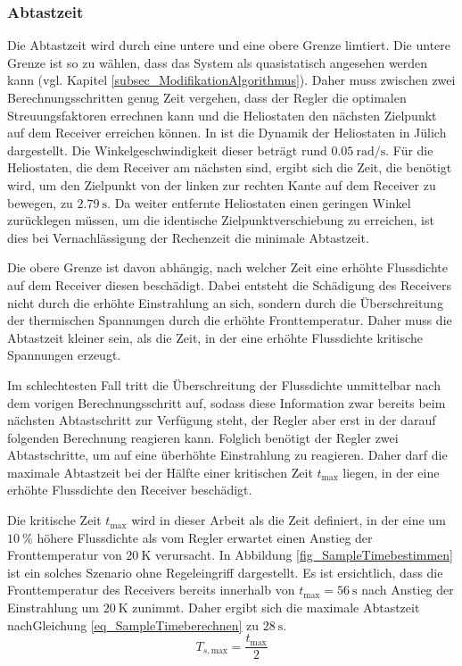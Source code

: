 \subsubsection*{Abtastzeit} \label{subsubsec_sampletime}
Die Abtastzeit wird durch eine untere und eine obere Grenze limtiert.
Die untere Grenze ist so zu wählen, dass das System als quasistatisch angesehen werden kann (vgl. Kapitel \ref{subsec_ModifikationAlgorithmus}).
Daher muss zwischen zwei Berechnungsschritten genug Zeit vergehen, dass der Regler die optimalen Streuungsfaktoren errechnen kann und die Heliostaten den nächsten Zielpunkt auf dem Receiver erreichen können.
In \cite[S.25-26]{DissZanger} ist die Dynamik der Heliostaten in Jülich dargestellt.
Die Winkelgeschwindigkeit dieser beträgt rund $\SI{0,05}{\radian \per \second}$.
Für die Heliostaten, die dem Receiver am nächsten sind, ergibt sich die Zeit, die benötigt wird, um den Zielpunkt von der linken zur rechten Kante auf dem Receiver zu bewegen, zu $\SI{2.79}{\second}$.
Da weiter entfernte Heliostaten einen geringen Winkel zurücklegen müssen, um die identische Zielpunktverschiebung zu erreichen, ist dies bei Vernachlässigung der Rechenzeit die minimale Abtastzeit.

Die obere Grenze ist davon abhängig, nach welcher Zeit eine erhöhte Flussdichte auf dem Receiver diesen beschädigt.
Dabei entsteht die Schädigung des Receivers nicht durch die erhöhte Einstrahlung an sich, sondern durch die Überschreitung der thermischen Spannungen durch die erhöhte Fronttemperatur.
Daher muss die Abtastzeit kleiner sein, als die Zeit, in der eine erhöhte Flussdichte kritische Spannungen erzeugt.

Im schlechtesten Fall tritt die Überschreitung der Flussdichte unmittelbar nach dem vorigen Berechnungsschritt auf, sodass diese Information zwar bereits beim nächsten Abtastschritt zur Verfügung steht, der Regler aber erst in der darauf folgenden Berechnung reagieren kann.
Folglich benötigt der Regler zwei Abtastschritte, um auf eine überhöhte Einstrahlung zu reagieren.
Daher darf die maximale Abtastzeit bei der Hälfte einer kritischen Zeit $t_{\mathrm{max}}$ liegen, in der eine erhöhte Flussdichte den Receiver beschädigt.

Die kritische Zeit $t_{\mathrm{max}}$ wird in dieser Arbeit als die Zeit definiert, in der eine um $\SI{10}{\percent}$ höhere Flussdichte als vom Regler erwartet einen Anstieg der Fronttemperatur von $\SI{20}{\kelvin}$ verursacht.
In Abbildung \ref{fig_SampleTimebestimmen} ist ein solches Szenario ohne Regeleingriff dargestellt.
Es ist ersichtlich, dass die Fronttemperatur des Receivers bereits innerhalb von $t_{\mathrm{max}} = \SI{56}{\second}$ nach Anstieg der Einstrahlung um $\SI{20}{\kelvin}$ zunimmt.
Daher ergibt sich die maximale Abtastzeit nach\linebreak Gleichung \ref{eq_SampleTimeberechnen} zu $\SI{28}{\second}$.
\begin{equation} \label{eq_SampleTimeberechnen}
    T_{s, \mathrm{max}} = \frac{t_{\mathrm{max}}}{2}
\end{equation}

